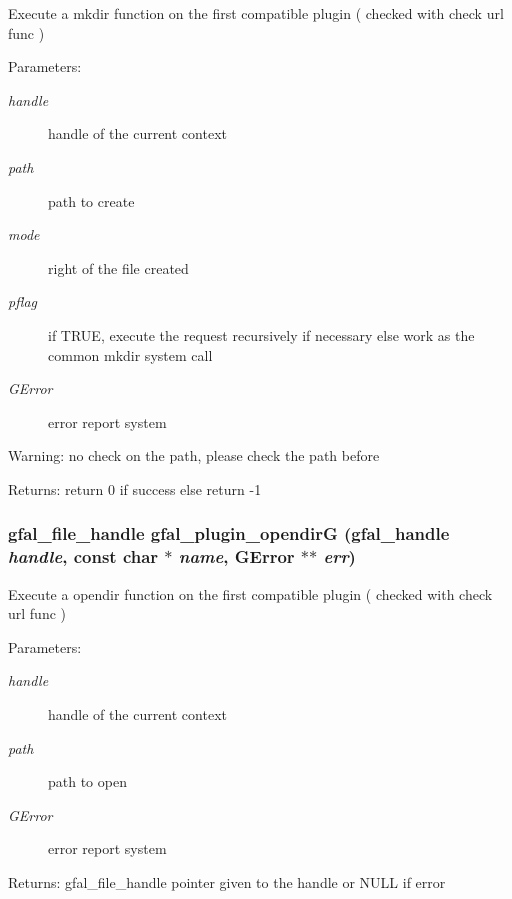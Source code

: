 Execute a mkdir function on the first compatible plugin ( checked with check url func ) \begin{Desc}
\item[Parameters:]
\begin{description}
\item[{\em handle}]handle of the current context \item[{\em path}]path to create \item[{\em mode}]right of the file created \item[{\em pflag}]if TRUE, execute the request recursively if necessary else work as the common mkdir system call \item[{\em GError}]error report system \end{description}
\end{Desc}
\begin{Desc}
\item[Warning:]no check on the path, please check the path before \end{Desc}
\begin{Desc}
\item[Returns:]return 0 if success else return -1 \end{Desc}
\subsubsection{\setlength{\rightskip}{0pt plus 5cm}gfal\_\-file\_\-handle gfal\_\-plugin\_\-opendir\-G (gfal\_\-handle {\em handle}, const char $\ast$ {\em name}, GError $\ast$$\ast$ {\em err})}\label{gfal__common__plugin_8c_0f8363d00d0f3418edaef414a84df034}


Execute a opendir function on the first compatible plugin ( checked with check url func ) \begin{Desc}
\item[Parameters:]
\begin{description}
\item[{\em handle}]handle of the current context \item[{\em path}]path to open \item[{\em GError}]error report system \end{description}
\end{Desc}
\begin{Desc}
\item[Returns:]gfal\_\-file\_\-handle pointer given to the handle or NULL if error \end{Desc}
